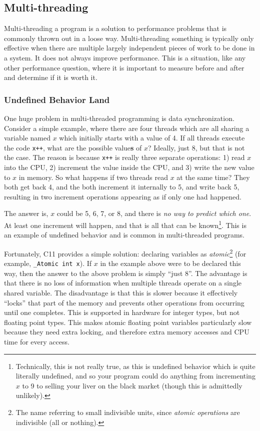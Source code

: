 \subsection{Multi-threading}

Multi-threading a program is a solution to performance problems that is commonly thrown out in a loose way. Multi-threading something is
typically only effective when there are multiple largely independent pieces of work to be done in a system. It does not always improve
performance. This is a situation, like any other performance question, where it is important to measure before and after and determine
if it is worth it.

\subsubsection{Undefined Behavior Land}

One huge problem in multi-threaded programming is data synchronization. Consider a simple example, where there are four threads which
are all sharing a variable named $x$ which initially starts with a value of 4. If all threads execute the code \texttt{x++}, what are
the possible value\textbf{s} of $x$? Ideally, just 8, but that is not the case. The reason is because \texttt{x++} is really three
separate operations: 1) read $x$ into the CPU, 2) increment the value inside the CPU, and 3) write the new value to $x$ in memory.
So what happens if two threads read $x$ at the same time? They both get back 4, and the both increment it internally to 5, and write
back 5, resulting in two increment operations appearing as if only one had happened.

The answer is, $x$ could be 5, 6, 7, or 8, and there is \textit{no way to predict which one}. At least one increment will happen, and
that is all that can be known\footnote{Technically, this is not really true, as this is undefined behavior which is quite literally undefined, and
so your program could do anything from incrementing $x$ to 9 to selling your liver on the black market (though this is admittedly unlikely).}. This is an example of undefined
behavior and is common in multi-threaded programs.

Fortunately, C11 provides a simple solution: declaring variables as \textit{atomic}\footnote{The name referring to small indivisible units, since \textit{atomic operations} are
indivisible (all or nothing).} (for example, \texttt{\_Atomic int x}). If $x$ in
the example above were to be declared this way, then the answer to the above problem is simply ``just 8''. The advantage is that there
is no loss of information when multiple threads operate on a single shared variable. The disadvantage is that this is slower because
it effectively ``locks'' that part of the memory and prevents other operations from occurring until one completes. This is supported
in hardware for integer types, but not floating point types. This makes atomic floating point variables particularly slow because they
need extra locking, and therefore extra memory accesses and CPU time for every access.

